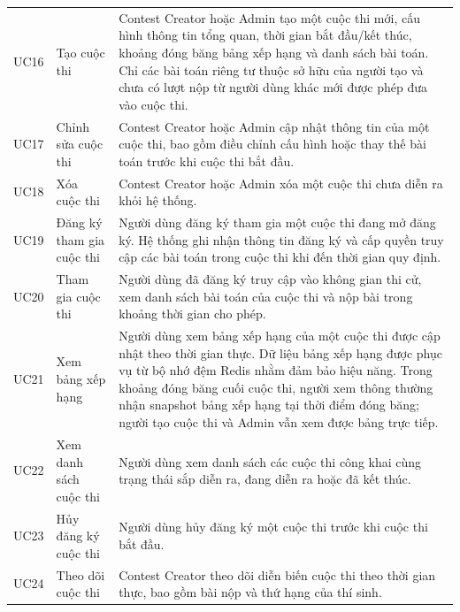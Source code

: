 \documentclass[12pt, a4paper]{report}
\begin{document}
\begin{longtable}{|>{\centering\arraybackslash}p{1.5cm}|>{\raggedright\arraybackslash}p{4.2cm}|>{\raggedright\arraybackslash}p{7.8cm}|}
  \multicolumn{3}{|l|}{\textbf{Nhóm 4: Quản lý và tham gia cuộc thi}} \\
  \hline
  UC16 & Tạo cuộc thi &
    Contest Creator hoặc Admin tạo một cuộc thi mới, cấu hình thông tin tổng quan, thời
    gian bắt đầu/kết thúc, khoảng đóng băng bảng xếp hạng và danh sách bài toán. Chỉ
    các bài toán riêng tư thuộc sở hữu của người tạo và chưa có lượt nộp từ người dùng
    khác mới được phép đưa vào cuộc thi. \\
  \hline
  UC17 & Chỉnh sửa cuộc thi &
    Contest Creator hoặc Admin cập nhật thông tin của một cuộc thi, bao gồm điều chỉnh cấu
    hình hoặc thay thế bài toán trước khi cuộc thi bắt đầu. \\
  \hline
  UC18 & Xóa cuộc thi &
    Contest Creator hoặc Admin xóa một cuộc thi chưa diễn ra khỏi hệ thống. \\
  \hline
  UC19 & Đăng ký tham gia cuộc thi &
    Người dùng đăng ký tham gia một cuộc thi đang mở đăng ký. Hệ thống ghi nhận thông tin
    đăng ký và cấp quyền truy cập các bài toán trong cuộc thi khi đến thời gian quy định.
    \\
  \hline
  UC20 & Tham gia cuộc thi &
    Người dùng đã đăng ký truy cập vào không gian thi cử, xem danh sách bài toán của cuộc
    thi và nộp bài trong khoảng thời gian cho phép. \\
  \hline
  UC21 & Xem bảng xếp hạng &
    Người dùng xem bảng xếp hạng của một cuộc thi được cập nhật theo thời gian thực. Dữ
    liệu bảng xếp hạng được phục vụ từ bộ nhớ đệm Redis nhằm đảm bảo hiệu năng. Trong khoảng
    đóng băng cuối cuộc thi, người xem thông thường nhận snapshot bảng xếp hạng tại thời
    điểm đóng băng; người tạo cuộc thi và Admin vẫn xem được bảng trực tiếp. \\
  \hline
  UC22 & Xem danh sách cuộc thi &
    Người dùng xem danh sách các cuộc thi công khai cùng trạng thái sắp diễn ra, đang diễn
    ra hoặc đã kết thúc. \\
  \hline
  UC23 & Hủy đăng ký cuộc thi &
    Người dùng hủy đăng ký một cuộc thi trước khi cuộc thi bắt đầu. \\
  \hline
  UC24 & Theo dõi cuộc thi &
    Contest Creator theo dõi diễn biến cuộc thi theo thời gian thực, bao gồm bài nộp và
    thứ hạng của thí sinh. \\
  \hline


\end{longtable}
\end{document}

